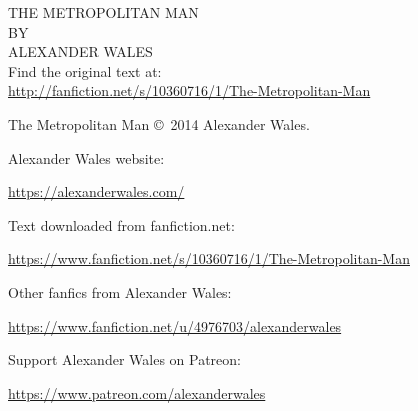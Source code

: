 \documentclass[ebook,12pt]{memoir}
\begin{document}
\thispagestyle{empty}  %
\phantom{lol}
\cleardoublepage

\begin{center}
\thispagestyle{empty}
\vspace*{0.2in}  %
\Huge\MakeUppercase{The Metropolitan Man}       \\
\vspace{0.5in}                                  
\large BY                                       \\
\vspace{0.1in}                                  
\LARGE \MakeUppercase{Alexander Wales}          \\
\normalsize                                     
\vspace{4in}
Find the original text at:                      \\
\footnotesize{\url{http://fanfiction.net/s/10360716/1/The-Metropolitan-Man}}
\end{center}
\clearpage

\thispagestyle{empty}
\footnotesize

\noindent The Metropolitan Man \copyright\ 2014 Alexander Wales.

\vspace{.2in}

\noindent Alexander Wales website:

\url{https://alexanderwales.com/}

\vspace{.2in}

\noindent Text downloaded from fanfiction.net:

\url{https://www.fanfiction.net/s/10360716/1/The-Metropolitan-Man}

\vspace{.2in}

\noindent Other fanfics from Alexander Wales:

\url{https://www.fanfiction.net/u/4976703/alexanderwales}

\vspace{.2in}

\noindent Support Alexander Wales on Patreon:

\url{https://www.patreon.com/alexanderwales}
\end{document}
